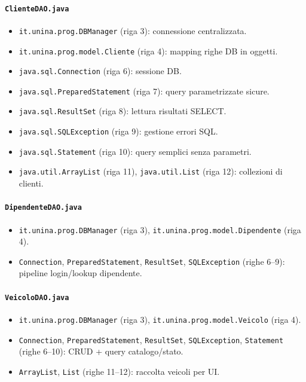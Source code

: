 \documentclass[12pt,a4paper]{article}
\begin{document}
\paragraph{\texttt{ClienteDAO.java}}
\begin{itemize}
  \item \texttt{it.unina.prog.DBManager} (riga 3): connessione centralizzata.
  \item \texttt{it.unina.prog.model.Cliente} (riga 4): mapping righe DB in oggetti.
  \item \texttt{java.sql.Connection} (riga 6): sessione DB.
  \item \texttt{java.sql.PreparedStatement} (riga 7): query parametrizzate sicure.
  \item \texttt{java.sql.ResultSet} (riga 8): lettura risultati SELECT.
  \item \texttt{java.sql.SQLException} (riga 9): gestione errori SQL.
  \item \texttt{java.sql.Statement} (riga 10): query semplici senza parametri.
  \item \texttt{java.util.ArrayList} (riga 11), \texttt{java.util.List} (riga 12): collezioni di clienti.
\end{itemize}

\paragraph{\texttt{DipendenteDAO.java}}
\begin{itemize}
  \item \texttt{it.unina.prog.DBManager} (riga 3), \texttt{it.unina.prog.model.Dipendente} (riga 4).
  \item \texttt{Connection}, \texttt{PreparedStatement}, \texttt{ResultSet}, \texttt{SQLException} (righe 6--9): pipeline login/lookup dipendente.
\end{itemize}

\paragraph{\texttt{VeicoloDAO.java}}
\begin{itemize}
  \item \texttt{it.unina.prog.DBManager} (riga 3), \texttt{it.unina.prog.model.Veicolo} (riga 4).
  \item \texttt{Connection}, \texttt{PreparedStatement}, \texttt{ResultSet}, \texttt{SQLException}, \texttt{Statement} (righe 6--10): CRUD + query catalogo/stato.
  \item \texttt{ArrayList}, \texttt{List} (righe 11--12): raccolta veicoli per UI.
\end{itemize}
\end{document}
